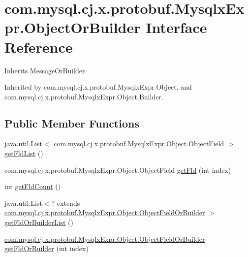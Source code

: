 \hypertarget{interfacecom_1_1mysql_1_1cj_1_1x_1_1protobuf_1_1_mysqlx_expr_1_1_object_or_builder}{}\section{com.\+mysql.\+cj.\+x.\+protobuf.\+Mysqlx\+Expr.\+Object\+Or\+Builder Interface Reference}
\label{interfacecom_1_1mysql_1_1cj_1_1x_1_1protobuf_1_1_mysqlx_expr_1_1_object_or_builder}


Inherits Message\+Or\+Builder.



Inherited by com.\+mysql.\+cj.\+x.\+protobuf.\+Mysqlx\+Expr.\+Object, and com.\+mysql.\+cj.\+x.\+protobuf.\+Mysqlx\+Expr.\+Object.\+Builder.

\subsection*{Public Member Functions}
\begin{DoxyCompactItemize}
\item 
java.\+util.\+List$<$ com.\+mysql.\+cj.\+x.\+protobuf.\+Mysqlx\+Expr.\+Object.\+Object\+Field $>$ \mbox{\hyperlink{interfacecom_1_1mysql_1_1cj_1_1x_1_1protobuf_1_1_mysqlx_expr_1_1_object_or_builder_a37bd329f1b42297aa860b2d93a75bd4c}{get\+Fld\+List}} ()
\item 
com.\+mysql.\+cj.\+x.\+protobuf.\+Mysqlx\+Expr.\+Object.\+Object\+Field \mbox{\hyperlink{interfacecom_1_1mysql_1_1cj_1_1x_1_1protobuf_1_1_mysqlx_expr_1_1_object_or_builder_a0d6038c51d8685004e28e70548dd8500}{get\+Fld}} (int index)
\item 
int \mbox{\hyperlink{interfacecom_1_1mysql_1_1cj_1_1x_1_1protobuf_1_1_mysqlx_expr_1_1_object_or_builder_adde28928caab4e53e490d54054fd26ae}{get\+Fld\+Count}} ()
\item 
java.\+util.\+List$<$? extends \mbox{\hyperlink{interfacecom_1_1mysql_1_1cj_1_1x_1_1protobuf_1_1_mysqlx_expr_1_1_object_1_1_object_field_or_builder}{com.\+mysql.\+cj.\+x.\+protobuf.\+Mysqlx\+Expr.\+Object.\+Object\+Field\+Or\+Builder}} $>$ \mbox{\hyperlink{interfacecom_1_1mysql_1_1cj_1_1x_1_1protobuf_1_1_mysqlx_expr_1_1_object_or_builder_ac816a83c0f742ab953fe7afb8534b20e}{get\+Fld\+Or\+Builder\+List}} ()
\item 
\mbox{\hyperlink{interfacecom_1_1mysql_1_1cj_1_1x_1_1protobuf_1_1_mysqlx_expr_1_1_object_1_1_object_field_or_builder}{com.\+mysql.\+cj.\+x.\+protobuf.\+Mysqlx\+Expr.\+Object.\+Object\+Field\+Or\+Builder}} \mbox{\hyperlink{interfacecom_1_1mysql_1_1cj_1_1x_1_1protobuf_1_1_mysqlx_expr_1_1_object_or_builder_a5d5f847320b210de75ed9898ac0b5d01}{get\+Fld\+Or\+Builder}} (int index)
\end{DoxyCompactItemize}


